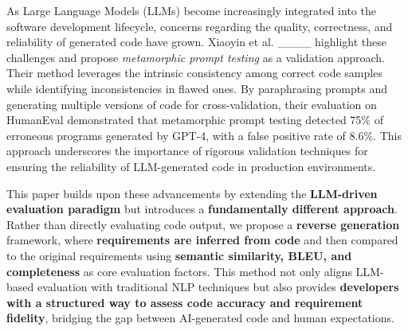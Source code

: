 As Large Language Models (LLMs) become increasingly integrated into the software development lifecycle, concerns regarding the quality, correctness, and reliability of generated code have grown. Xiaoyin et al. ____ highlight these challenges and propose \textit{metamorphic prompt testing} as a validation approach. Their method leverages the intrinsic consistency among correct code samples while identifying inconsistencies in flawed ones. By paraphrasing prompts and generating multiple versions of code for cross-validation, their evaluation on HumanEval demonstrated that metamorphic prompt testing detected 75\% of erroneous programs generated by GPT-4, with a false positive rate of 8.6\%. This approach underscores the importance of rigorous validation techniques for ensuring the reliability of LLM-generated code in production environments.

This paper builds upon these advancements by extending the \textbf{LLM-driven evaluation paradigm} but introduces a \textbf{fundamentally different approach}. Rather than directly evaluating code output, we propose a \textbf{reverse generation} framework, where \textbf{requirements are inferred from code} and then compared to the original requirements using \textbf{semantic similarity, BLEU, and completeness} as core evaluation factors. This method not only aligns LLM-based evaluation with traditional NLP techniques but also provides \textbf{developers with a structured way to assess code accuracy and requirement fidelity}, bridging the gap between AI-generated code and human expectations.